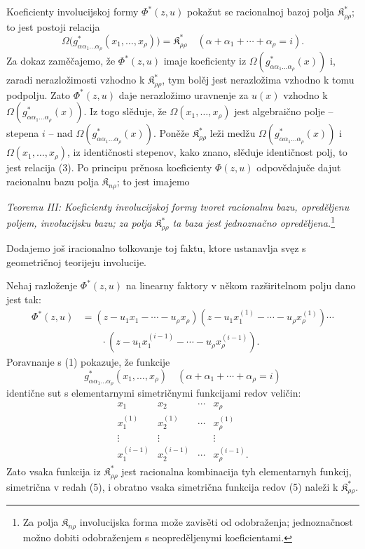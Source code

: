 \documentclass[11pt]{article}
\providecommand{\Kfield}{\mathfrak{K}}
\begin{document}
Koeficienty involucijskoj formy $\Phi^*(z,u)$ pokažut se racionalnoj bazoj polja $\Kfield^*_{\rho\rho}$; to jest postoji relacija
\begin{equation}
  \Omega\bigl(g^*_{\alpha\alpha_1\ldots\alpha_\rho}(x_1,
  \ldots,x_\rho)\bigr)=\Kfield^*_{\rho\rho}
  \quad(\alpha+\alpha_1+\cdots+\alpha_\rho=i).
\tag{3}
\end{equation}
Za dokaz zaměčajemo, že $\Phi^*(z,u)$ imaje koeficienty iz $\Omega(g^*_{\alpha\alpha_1\ldots\alpha_\rho}(x))$ i, zaradi nerazložimosti vzhodno k $\Kfield^*_{\rho\rho}$, tym bolěj jest nerazložima vzhodno k tomu podpolju. Zato $\Phi^*(z,u)$ daje nerazložimo uravnenje za $u(x)$ vzhodno k $\Omega(g^*_{\alpha\alpha_1\ldots\alpha_\rho}(x))$. Iz togo slěduje, že $\Omega(x_1,\ldots,x_\rho)$ jest algebraično polje -- stepena $i$ -- nad $\Omega(g^*_{\alpha\alpha_1\ldots\alpha_\rho}(x))$. Poněže $\Kfield^*_{\rho\rho}$ leži medžu $\Omega(g^*_{\alpha\alpha_1\ldots\alpha_\rho}(x))$ i $\Omega(x_1,\ldots,x_\rho)$, iz identičnosti stepenov, kako znano, slěduje identičnost polj, to jest relacija (3). Po principu prěnosa koeficienty $\Phi(z,u)$ odpovědajuče dajut racionalnu bazu polja $\Kfield_{n\rho}$; to jest imajemo

{\itshape Teoremu III: Koeficienty involucijskoj formy tvoret racionalnu bazu, opreděljenu poljem, involucijsku bazu; za polja $\Kfield^*_{\rho\rho}$ ta baza jest jednoznačno opreděljena.}\footnote{Za polja $\Kfield_{n\rho}$ involucijska forma može zavisěti od odobraženja; jednoznačnost možno dobiti odobraženjem s neopreděljenymi koeficientami.}

Dodajemo još iracionalno tolkovanje toj faktu, ktore ustanavlja svęz s geometričnoj teorijeju involucije.

Nehaj razloženje $\Phi^*(z,u)$ na linearny faktory v někom razširitelnom polju dano jest tak:
\begin{equation}
\begin{aligned}
 \Phi^*(z,u)&=(z-u_1x_1-\cdots-u_\rho x_\rho)
 (z-u_1x_1^{(1)}-\cdots-u_\rho x_\rho^{(1)})\cdots\\
 &\qquad\cdot
 (z-u_1x_1^{(i-1)}-\cdots-u_\rho x_\rho^{(i-1)}).
\end{aligned}
\tag{4}
\end{equation}
Poravnanje s (1) pokazuje, že funkcije
\[
  g^*_{\alpha\alpha_1\ldots\alpha_\rho}(x_1,
  \ldots,x_\rho)\quad(\alpha+\alpha_1+\cdots+\alpha_\rho=i)
\]
identične sut s elementarnymi simetričnymi funkcijami redov veličin:
\begin{equation}
\begin{array}{cccc}
  x_1 & x_2 & \cdots & x_\rho\\
  x_1^{(1)} & x_2^{(1)} & \cdots & x_\rho^{(1)}\\
  \vdots & \vdots & & \vdots\\
  x_1^{(i-1)} & x_2^{(i-1)} & \cdots & x_\rho^{(i-1)}.
\end{array}
\tag{5}
\end{equation}
Zato vsaka funkcija iz $\Kfield^*_{\rho\rho}$ jest racionalna kombinacija tyh elementarnyh funkcij, simetrična v redah (5), i obratno vsaka simetrična funkcija redov (5) naleži k $\Kfield^*_{\rho\rho}$.
\end{document}
